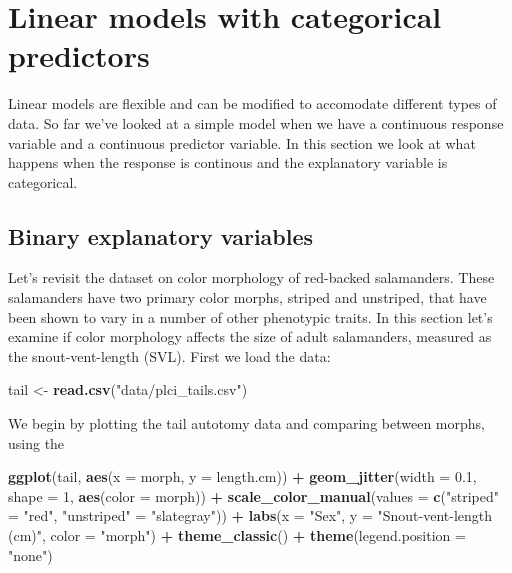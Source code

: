 \documentclass[
]{book}
\newenvironment{Shaded}{\begin{snugshade}}{\end{snugshade}}
\newcommand{\AttributeTok}[1]{\textcolor[rgb]{0.13,0.29,0.53}{#1}}
\newcommand{\DecValTok}[1]{\textcolor[rgb]{0.00,0.00,0.81}{#1}}
\newcommand{\FloatTok}[1]{\textcolor[rgb]{0.00,0.00,0.81}{#1}}
\newcommand{\FunctionTok}[1]{\textcolor[rgb]{0.13,0.29,0.53}{\textbf{#1}}}
\newcommand{\NormalTok}[1]{#1}
\newcommand{\OtherTok}[1]{\textcolor[rgb]{0.56,0.35,0.01}{#1}}
\newcommand{\SpecialCharTok}[1]{\textcolor[rgb]{0.81,0.36,0.00}{\textbf{#1}}}
\newcommand{\StringTok}[1]{\textcolor[rgb]{0.31,0.60,0.02}{#1}}
\begin{document}
\section{Linear models with categorical predictors}\label{linear-models-with-categorical-predictors}

Linear models are flexible and can be modified to accomodate different types of data. So far we've looked at a simple model when we have a continuous response variable and a continuous predictor variable. In this section we look at what happens when the response is continous and the explanatory variable is categorical.

\subsection{Binary explanatory variables}\label{binary-explanatory-variables}

Let's revisit the dataset on color morphology of red-backed salamanders. These salamanders have two primary color morphs, striped and unstriped, that have been shown to vary in a number of other phenotypic traits. In this section let's examine if color morphology affects the size of adult salamanders, measured as the snout-vent-length (SVL). First we load the data:

\begin{Shaded}
\begin{Highlighting}[]
\NormalTok{tail }\OtherTok{\textless{}{-}} \FunctionTok{read.csv}\NormalTok{(}\StringTok{"data/plci\_tails.csv"}\NormalTok{)}
\end{Highlighting}
\end{Shaded}

We begin by plotting the tail autotomy data and comparing between morphs, using the

\begin{Shaded}
\begin{Highlighting}[]
\FunctionTok{ggplot}\NormalTok{(tail, }\FunctionTok{aes}\NormalTok{(}\AttributeTok{x =}\NormalTok{ morph, }\AttributeTok{y =}\NormalTok{ length.cm)) }\SpecialCharTok{+}
  \FunctionTok{geom\_jitter}\NormalTok{(}\AttributeTok{width =} \FloatTok{0.1}\NormalTok{, }\AttributeTok{shape =} \DecValTok{1}\NormalTok{, }\FunctionTok{aes}\NormalTok{(}\AttributeTok{color =}\NormalTok{ morph)) }\SpecialCharTok{+}
  \FunctionTok{scale\_color\_manual}\NormalTok{(}\AttributeTok{values =} \FunctionTok{c}\NormalTok{(}\StringTok{"striped"} \OtherTok{=} \StringTok{"red"}\NormalTok{, }\StringTok{"unstriped"} \OtherTok{=} \StringTok{"slategray"}\NormalTok{)) }\SpecialCharTok{+}
  \FunctionTok{labs}\NormalTok{(}\AttributeTok{x =} \StringTok{"Sex"}\NormalTok{, }\AttributeTok{y =} \StringTok{"Snout{-}vent{-}length (cm)"}\NormalTok{, }\AttributeTok{color =} \StringTok{"morph"}\NormalTok{) }\SpecialCharTok{+}
  \FunctionTok{theme\_classic}\NormalTok{() }\SpecialCharTok{+}
  \FunctionTok{theme}\NormalTok{(}\AttributeTok{legend.position =} \StringTok{"none"}\NormalTok{)}
\end{Highlighting}
\end{Shaded}
\end{document}
